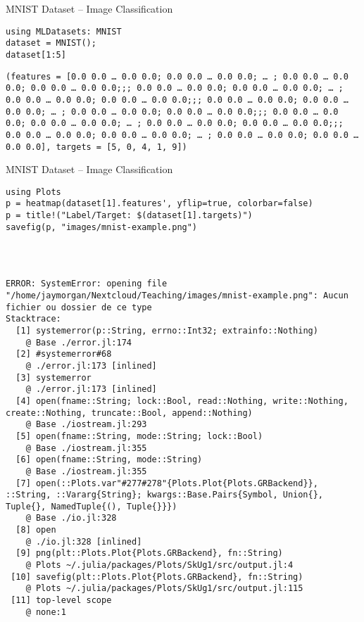 \documentclass[10pt]{beamer}
\begin{document}
\begin{frame}[label={sec:orgf8a866d},fragile]{MNIST Dataset -- Image Classification}
 \begin{verbatim}
using MLDatasets: MNIST
dataset = MNIST();
dataset[1:5]
\end{verbatim}

\begin{verbatim}
(features = [0.0 0.0 … 0.0 0.0; 0.0 0.0 … 0.0 0.0; … ; 0.0 0.0 … 0.0 0.0; 0.0 0.0 … 0.0 0.0;;; 0.0 0.0 … 0.0 0.0; 0.0 0.0 … 0.0 0.0; … ; 0.0 0.0 … 0.0 0.0; 0.0 0.0 … 0.0 0.0;;; 0.0 0.0 … 0.0 0.0; 0.0 0.0 … 0.0 0.0; … ; 0.0 0.0 … 0.0 0.0; 0.0 0.0 … 0.0 0.0;;; 0.0 0.0 … 0.0 0.0; 0.0 0.0 … 0.0 0.0; … ; 0.0 0.0 … 0.0 0.0; 0.0 0.0 … 0.0 0.0;;; 0.0 0.0 … 0.0 0.0; 0.0 0.0 … 0.0 0.0; … ; 0.0 0.0 … 0.0 0.0; 0.0 0.0 … 0.0 0.0], targets = [5, 0, 4, 1, 9])
\end{verbatim}
\end{frame}

\begin{frame}[label={sec:org682382e},fragile]{MNIST Dataset -- Image Classification}
 \begin{verbatim}
using Plots
p = heatmap(dataset[1].features', yflip=true, colorbar=false)
p = title!("Label/Target: $(dataset[1].targets)")
savefig(p, "images/mnist-example.png")
\end{verbatim}

\begin{verbatim}



ERROR: SystemError: opening file "/home/jaymorgan/Nextcloud/Teaching/images/mnist-example.png": Aucun fichier ou dossier de ce type
Stacktrace:
  [1] systemerror(p::String, errno::Int32; extrainfo::Nothing)
    @ Base ./error.jl:174
  [2] #systemerror#68
    @ ./error.jl:173 [inlined]
  [3] systemerror
    @ ./error.jl:173 [inlined]
  [4] open(fname::String; lock::Bool, read::Nothing, write::Nothing, create::Nothing, truncate::Bool, append::Nothing)
    @ Base ./iostream.jl:293
  [5] open(fname::String, mode::String; lock::Bool)
    @ Base ./iostream.jl:355
  [6] open(fname::String, mode::String)
    @ Base ./iostream.jl:355
  [7] open(::Plots.var"#277#278"{Plots.Plot{Plots.GRBackend}}, ::String, ::Vararg{String}; kwargs::Base.Pairs{Symbol, Union{}, Tuple{}, NamedTuple{(), Tuple{}}})
    @ Base ./io.jl:328
  [8] open
    @ ./io.jl:328 [inlined]
  [9] png(plt::Plots.Plot{Plots.GRBackend}, fn::String)
    @ Plots ~/.julia/packages/Plots/SkUg1/src/output.jl:4
 [10] savefig(plt::Plots.Plot{Plots.GRBackend}, fn::String)
    @ Plots ~/.julia/packages/Plots/SkUg1/src/output.jl:115
 [11] top-level scope
    @ none:1
\end{verbatim}
\end{frame}
\end{document}
